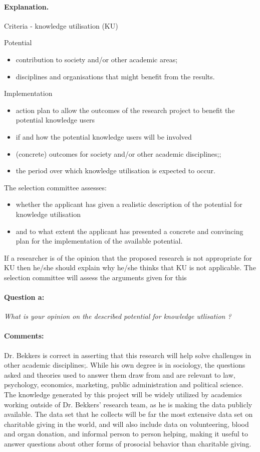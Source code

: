 \documentclass[twocolumn, serif, rga, numeric]{jote-article}
\begin{document}
\paragraph{Explanation.}
Criteria - knowledge utilisation (KU)

\noindent Potential 
\begin{itemize}
\item contribution to society and/or other academic areas; \item disciplines and organisations that might benefit from the results. 
\end{itemize}
Implementation \begin{itemize}

\item action plan to allow the outcomes of the research project to benefit the potential knowledge users\item if and how the potential knowledge users will be involved\item (concrete) outcomes for society and/or other academic disciplines;;\item the period over which knowledge utilisation is expected to occur. 
\end{itemize}
The selection committee assesses: 
\begin{itemize}


\item whether the applicant has given a realistic description of the potential for knowledge utilisation\item and to what extent the applicant has presented a concrete and convincing plan for the implementation of the available potential. 
\end{itemize}

If a researcher is of the opinion that the proposed research is not appropriate for KU then he/she should explain why he/she thinks that KU is not applicable. The selection committee will assess the arguments given for this
\paragraph{Question a:}
\textit{What is your opinion on the described potential for knowledge utlisation ?}
\paragraph{Comments:}
Dr. Bekkers is correct in asserting that this research will help solve challenges in other academic disciplines;. While his own degree is in sociology, the questions asked and theories used to answer them draw from and are relevant to law, psychology, economics, marketing, public administration and political science.   The knowledge generated by this project will be widely utilized by academics working outside of Dr. Bekkers' research team, as he is making the data publicly available. The data set that he collects will be far the most extensive data set on charitable giving in the world, and will also include data on volunteering, blood and organ donation, and informal person to person helping, making it useful to answer questions about other forms of prosocial behavior than charitable giving.
\end{document}
